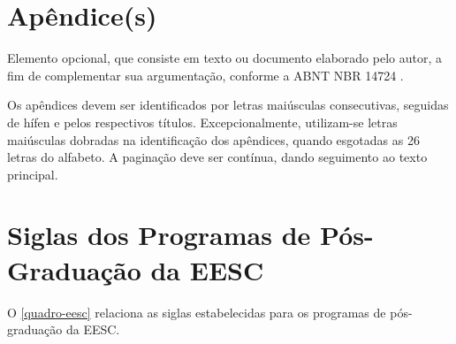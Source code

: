 
\begin{apendicesenv}
\partapendices
\chapter{Ap\^endice(s)}
Elemento opcional, que consiste em texto ou documento elaborado pelo autor, a fim de complementar sua argumentação, conforme a ABNT NBR 14724 \cite{nbr14724}.

Os ap\^endices devem ser identificados por letras maiúsculas consecutivas, seguidas de hífen e pelos respectivos títulos. Excepcionalmente, utilizam-se letras maiúsculas dobradas na identificação dos ap\^endices, quando esgotadas as 26 letras do alfabeto. A paginação deve ser contínua, dando seguimento ao texto principal. \cite{sibi2009}

\chapter{Siglas dos Programas de Pós-Graduação da EESC}
O \autoref{quadro-eesc} relaciona as siglas estabelecidas para os programas de pós-graduação da EESC.


\end{apendicesenv}
